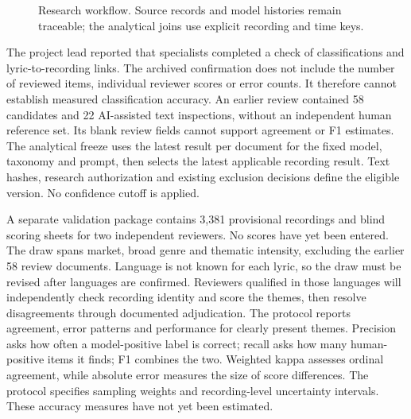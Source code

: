 \documentclass[10pt,a4paper,twocolumn]{article}
\begin{document}
\begin{figure}[t]
\centering
{}
\caption{Research workflow. Source records and model histories remain traceable; the analytical joins use explicit recording and time keys.}
\label{fig:workflow}
\end{figure}

The project lead reported that specialists completed a check of classifications and lyric-to-recording links. The archived confirmation does not include the number of reviewed items, individual reviewer scores or error counts. It therefore cannot establish measured classification accuracy. An earlier review contained 58 candidates and 22 AI-assisted text inspections, without an independent human reference set. Its blank review fields cannot support agreement or F1 estimates. The analytical freeze uses the latest result per document for the fixed model, taxonomy and prompt, then selects the latest applicable recording result. Text hashes, research authorization and existing exclusion decisions define the eligible version. No confidence cutoff is applied.

A separate validation package contains 3,381 provisional recordings and blind scoring sheets for two independent reviewers. No scores have yet been entered. The draw spans market, broad genre and thematic intensity, excluding the earlier 58 review documents. Language is not known for each lyric, so the draw must be revised after languages are confirmed. Reviewers qualified in those languages will independently check recording identity and score the themes, then resolve disagreements through documented adjudication. The protocol reports agreement, error patterns and performance for clearly present themes. Precision asks how often a model-positive label is correct; recall asks how many human-positive items it finds; F1 combines the two. Weighted kappa assesses ordinal agreement, while absolute error measures the size of score differences. The protocol specifies sampling weights and recording-level uncertainty intervals. These accuracy measures have not yet been estimated.
\end{document}
